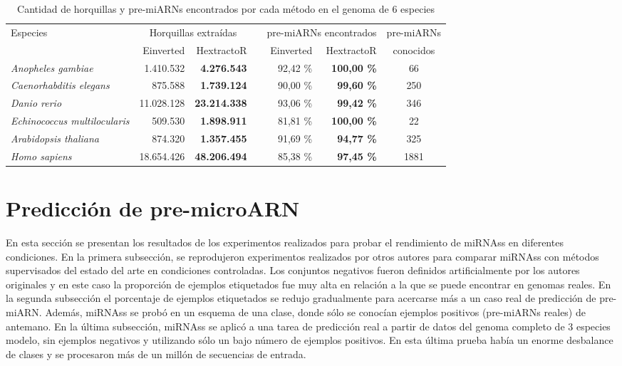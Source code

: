 \begin{table}[t]
	\centering
	\small
	\begin{tabular}{l r r r r r c}
		\toprule
		\multirow{2}{*}{Especies} & \multicolumn{2}{c}{Horquillas extraídas}  & & \multicolumn{2}{c}{pre-miARNs encontrados}    &    pre-miARNs  \\ \cmidrule{2-3} \cmidrule{5-6}
						    &    Einverted  &       HextractoR     & & Einverted     &   HextractoR  &  conocidos \\ \cmidrule{1-7}
		\textit{Anopheles gambiae}          &  1.410.532    &  \textbf{4.276.543}  & &  92,42 \%     &    \textbf{100,00  \%}       &   66        \\
		\textit{Caenorhabditis elegans}     &    875.588    &  \textbf{1.739.124}  & &  90,00 \%     &     \textbf{99,60  \%}       &  250        \\
		\textit{Danio rerio}                & 11.028.128    & \textbf{23.214.338}  & &  93,06 \%     &     \textbf{99,42  \%}       &  346        \\
		\textit{Echinococcus multilocularis}&    509.530    &  \textbf{1.898.911}  & &  81,81 \%     &    \textbf{100,00  \%}       &   22        \\
		\textit{Arabidopsis thaliana}       &    874.320    &  \textbf{1.357.455}  & &  91,69 \%     &     \textbf{94,77  \%}       &  325        \\
		\textit{Homo sapiens}               & 18.654.426    & \textbf{48.206.494}  & &  85,38 \%     &     \textbf{97,45  \%}       & 1881        \\
		\bottomrule
	\end{tabular}
	\label{tab:hextractor}
	\caption[Cantidad de horquillas y pre-miARN en varios genomas]{Cantidad de horquillas y pre-miARNs encontrados por cada método en el genoma de 6 especies}
\end{table}

\section{Predicción de pre-microARN}

En esta sección se presentan los resultados de los experimentos realizados para probar el rendimiento de miRNAss en diferentes condiciones. En la primera
subsección, se reprodujeron experimentos realizados por otros autores para comparar miRNAss con métodos supervisados del estado del arte en condiciones
controladas. Los conjuntos negativos fueron definidos artificialmente por los autores originales y en este caso la proporción de ejemplos etiquetados fue muy
alta en relación a la que se puede encontrar en genomas reales. En la segunda subsección el porcentaje de ejemplos etiquetados se redujo gradualmente para
acercarse más a un caso real de predicción de pre-miARN. Además, miRNAss se probó en un esquema de una clase, donde sólo se conocían ejemplos positivos
(pre-miARNs reales) de antemano. En la última subsección, miRNAss se aplicó a una tarea de predicción real a partir de datos del genoma completo de 3 especies
modelo, sin ejemplos negativos y utilizando sólo un bajo número de ejemplos positivos. En esta última prueba había un enorme desbalance de clases y se
procesaron más de un millón de secuencias de entrada.

